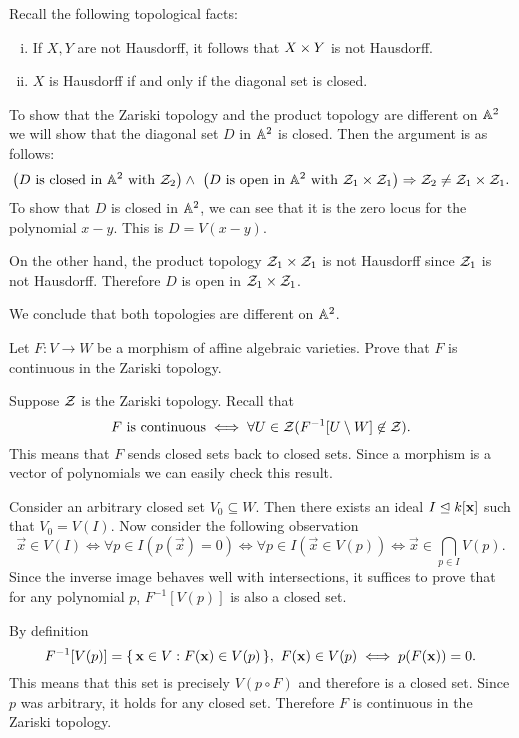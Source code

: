 \documentclass[12pt]{memoir}
\begin{document}
\begin{ptcbr}
Recall the following topological facts:
\vspace{-0.4em}
\begin{enumerate}[i)]
  \itemsep=-0.4em
  \item If $X,Y$ are not Hausdorff, it follows that $X\times Y$ is not Hausdorff.
  \item $X$ is Hausdorff if and only if the diagonal set is closed.
\end{enumerate}  
To show that the Zariski topology and the product topology are different on $\mathbb{A}^2$ we will show that the diagonal set $D$ in $\mathbb{A}^2$ is closed. Then the argument is as follows:
 $$ \left(D \text{ is closed in } \mathbb{A}^2 \text{ with }\mathcal{Z}_2\right)
 \land\ \left(D \text{ is open in } \mathbb{A}^2 \text{ with }\mathcal{Z}_1\times\mathcal{Z}_1\right)
 \Rightarrow \mathcal{Z}_2\neq\mathcal{Z}_1\times\mathcal{Z}_1.$$
 To show that $D$ is closed in $\mathbb{A}^2$, we can see that it is the zero locus for the polynomial $x-y$. This is $D=V(x-y)$.\par 
 On the other hand, the product topology $\mathcal{Z}_1\times\mathcal{Z}_1$ is not Hausdorff since $\mathcal{Z}_1$ is not Hausdorff. Therefore $D$ is open in $\mathcal{Z}_1\times\mathcal{Z}_1$.\par 
 We conclude that both topologies are different on $\mathbb{A}^2$.
\end{ptcbr}

\begin{Ej}
  Let $F:V\to W$ be a morphism of affine algebraic varieties.
 Prove that $F$ is continuous in the Zariski topology. 
\end{Ej}

\begin{ptcbr}
  Suppose $\mathcal{Z}$ is the Zariski topology. Recall that
  $$F \text{ is continuous}\iff \forall U\in\mathcal{Z}(F^{-1}[U\setminus W]\not\in\mathcal{Z}).$$
  This means that $F$ sends closed sets back to closed sets. Since a morphism is a vector of polynomials we can easily check this result.\par 
  Consider an arbitrary closed set $V_0\subseteq W$. Then there exists an ideal $I\trianglelefteq k[\mathbf{x}]$ such that $V_0=V(I)$. Now consider the following observation
  $$\vec x\in V(I)\iff \forall p\in I(p(\vec x)=0)\iff\forall p\in I(\vec x\in V(p))\iff \vec x\in \bigcap_{p\in I}V(p).$$
  Since the inverse image behaves well with intersections, it suffices to prove that for any polynomial $p$, $F^{-1}[V(p)]$ is also a closed set.\par 
  By definition 
  $$F^{-1}[V(p)]=\{\,\mathbf{x}\in V:F(\mathbf{x})\in V(p)\,\},\ F(\mathbf{x})\in V(p)\iff p(F(\mathbf{x}))=0.$$
  This means that this set is precisely $V(p\circ F)$ and therefore is a closed set. Since $p$ was arbitrary, it holds for any closed set. Therefore $F$ is continuous in the Zariski topology.
\end{ptcbr}
\end{document}
